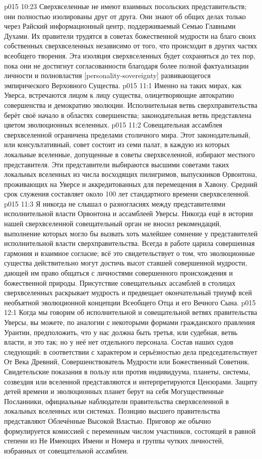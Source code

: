 \vs p015 10:23 Сверхвселенные не имеют взаимных посольских представительств; они полностью изолированы друг от друга. Они знают об общих делах только через Райский информационный центр, поддерживаемый Семью Главными Духами. Их правители трудятся в советах божественной мудрости на благо своих собственных сверхвселенных независимо от того, что происходит в других частях всеобщего творения. Эта изоляция сверхвселенных будет сохраняться до тех пор, пока они не достигнут согласованности благодаря более полной фактуализации личности и полновластия [personality\hyp{}sovereignty] развивающегося эмпирического Верховного Существа.
\vs p015 11:1 Именно на таких мирах, как Уверса, встречаются лицом к лицу существа, олицетворяющие автократию совершенства и демократию эволюции. Исполнительная ветвь сверхправительства берёт своё начало в областях совершенства; законодательная ветвь представлена цветом эволюционных вселенных.
\vs p015 11:2 Совещательная ассамблея сверхвселенной ограничена пределами столичного мира. Этот законодательный, или консультативный, совет состоит из семи палат, в каждую из которых локальные вселенные, допущенные в советы сверхвселенной, избирают местного представителя. Эти представители выбираются высшими советами таких локальных вселенных из числа восходящих пилигримов, выпускников Орвонтона, проживающих на Уверсе и аккредитованных для перемещения в Хавону. Средний срок служения составляет около 100 лет стандартного времени сверхвселенной.
\vs p015 11:3 Я никогда не слышал о разногласиях между представителями исполнительной власти Орвонтона и ассамблеей Уверсы. Никогда ещё в истории нашей сверхвселенной совещательный орган не вносил рекомендаций, выполнение которых могло бы вызвать хоть малейшее сомнение у представителей исполнительной власти сверхправительства. Всегда в работе царила совершенная гармония и взаимное согласие; всё это свидетельствует о том, что эволюционные существа действительно могут достичь высот ставшей совершенной мудрости, дающей им право общаться с личностями совершенного происхождения и божественной природы. Присутствие совещательных ассамблей в столицах сверхвселенных раскрывает мудрость и предвещает окончательный триумф всей необъятной эволюционной концепции Всеобщего Отца и его Вечного Сына.
\vs p015 12:1 Когда мы говорим об исполнительной и совещательной ветвях правительства Уверсы, вы можете, по аналогии с некоторыми формами гражданского правления Урантии, предположить, что у нас должна быть третья, или судебная, ветвь власти, и это так; но у неё нет отдельного персонала. Состав наших судов следующий: в соответствии с характером и серьёзностью дела председательствует От Века Древний, Совершенствователь Мудрости или Божественный Советник. Свидетельские показания в пользу или против индивидуума, планеты, системы, созвездия или вселенной представляются и интерпретируются Цензорами. Защиту детей времени и эволюционных планет берут на себя Могущественные Посланники, официальные наблюдатели правительства сверхвселенной в локальных вселенных или системах. Позицию высшего правительства представляют Облечённые Высокой Властью. Приговор же обычно формулируется комиссией с переменным числом участников, состоящей в равной степени из Не Имеющих Имени и Номера и группы чутких личностей, избранных от совещательной ассамблеи.
